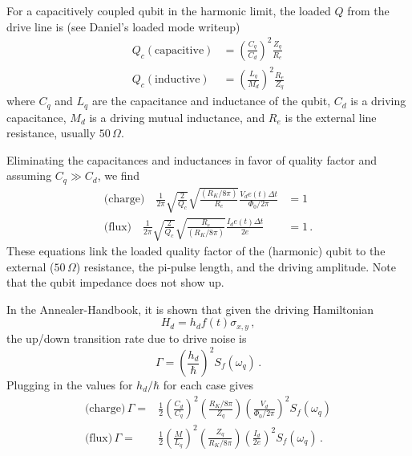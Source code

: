 
For a capacitively coupled qubit in the harmonic limit, the loaded $Q$ from the drive line is (see Daniel's loaded mode writeup)
\begin{align*}
  Q_c (\text{capacitive}) &= \left( \frac{C_q}{C_d} \right)^2 \frac{Z_q}{R_e} \\
  Q_c (\text{inductive}) &= \left( \frac{L_q}{M_d} \right)^2 \frac{R_e}{Z_q}
\end{align*}
where $C_q$ and $L_q$ are the capacitance and inductance of the qubit, $C_d$ is a driving capacitance, $M_d$ is a driving mutual inductance, and $R_e$ is the external line resistance, usually $50 \, \Omega$.

Eliminating the capacitances and inductances in favor of quality factor and assuming $C_q \gg C_d$, we find
\begin{align*}
  \text{(charge)} \quad
    \frac{1}{2\pi} \sqrt{\frac{2}{Q_c}}
    \sqrt{\frac{(R_K/8\pi)}{R_e}} \frac{V_d e(t) \Delta t}{\Phi_0/2\pi} &= 1 \\
  \text{(flux)} \quad
    \frac{1}{2\pi} \sqrt{\frac{2}{Q_c}}
    \sqrt{\frac{R_e}{(R_K/8\pi)}} \frac{I_d e(t) \Delta t}{2e} &= 1 \, .
\end{align*}
These equations link the loaded quality factor of the (harmonic) qubit to the external ($50 \, \Omega$) resistance, the pi-pulse length, and the driving amplitude.
Note that the qubit impedance does not show up.

In the Annealer-Handbook, it is shown that given the driving Hamiltonian
\begin{displaymath}
  H_d = h_d f(t) \sigma_{x,y} \, ,
\end{displaymath}
the up/down transition rate due to drive noise is
\begin{equation*}
  \Gamma = \left( \frac{h_d}{\hbar} \right)^2 S_f(\omega_q) \, .
\end{equation*}
Plugging in the values for $h_d/\hbar$ for each case gives
\begin{align*}
  \text{(charge)} \, \Gamma =&
    \frac{1}{2} \left( \frac{C_d}{C_q} \right)^2
    \left( \frac{R_K/8\pi}{Z_q} \right) \left( \frac{V_d}{\Phi_0/2\pi} \right)^2
    S_f(\omega_q) \\
  \text{(flux)} \, \Gamma =&
    \frac{1}{2} \left( \frac{M}{L_q} \right)^2
    \left( \frac{Z_q}{R_K/8\pi} \right) \left( \frac{I_d}{2e} \right)^2
    S_f(\omega_q) \, .
\end{align*}
